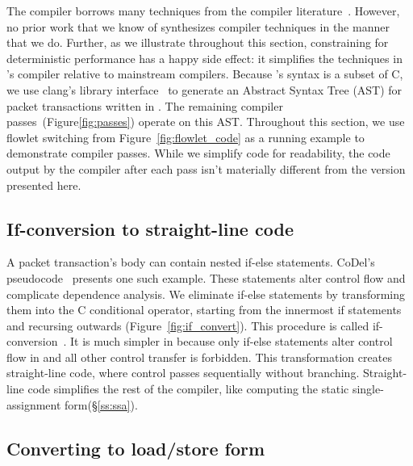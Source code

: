 The \pktlanguage compiler borrows many techniques from the compiler
literature~\cite{muchnik}. However, no prior work that we know of synthesizes
compiler techniques in the manner that we do. Further, as we illustrate
throughout this section, constraining \pktlanguage for deterministic
performance has a happy side effect: it simplifies the techniques in
\pktlanguage's compiler relative to mainstream compilers. Because
\pktlanguage's syntax is a subset of C, we use clang's library
interface~\cite{libclang} to generate an Abstract Syntax Tree (AST) for packet
transactions written in \pktlanguage. The remaining compiler
passes~(Figure\ref{fig:passes}) operate on this AST. Throughout this section,
we use flowlet switching from Figure~\ref{fig:flowlet_code} as a running
example to demonstrate compiler passes.  While we simplify code for
readability, the code output by the \pktlanguage compiler after each pass isn't
materially different from the version presented here.

\subsection{If-conversion to straight-line code}
A packet transaction's body can contain nested if-else statements. CoDel's
pseudocode~\cite{codel_code} presents one such example. These statements alter
control flow and complicate dependence analysis. We eliminate if-else
statements by transforming them into the C conditional operator, starting from
the innermost if statements and recursing outwards
(Figure~\ref{fig:if_convert}). This procedure is called
if-conversion~\cite{if_conversion}. It is much simpler in \pktlanguage because
only if-else statements alter control flow in \pktlanguage and all other
control transfer is forbidden.  This transformation creates straight-line code,
where control passes sequentially without branching.  Straight-line code
simplifies the rest of the compiler, like computing the static
single-assignment form(\S\ref{ss:ssa}).

\subsection{Converting to load/store form}
\label{ss:load/store}

